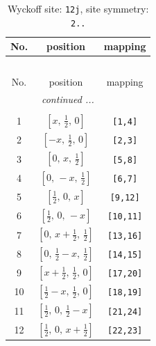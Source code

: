\documentclass[fleqn,8pt]{jsarticle}
\begin{document}
\begin{longtable}{ccc}
\caption{Wyckoff site: {\tt 12j}, site symmetry: {\tt 2..}}
 \\
 \hline \hline
No. & position & mapping \\ \hline \endfirsthead

\multicolumn{2}{l}{\tablename\ \thetable{}} \\
 \hline \hline
No. & position & mapping \\ \hline \endhead

 \hline \hline
\multicolumn{2}{r}{\footnotesize\it continued ...} \\ \endfoot

 \hline \hline
\multicolumn{2}{r}{} \\ \endlastfoot

1 & $\left[ x,\, \frac{1}{2},\, 0 \right]$ & {\tt [1,4]} \\ \hline
2 & $\left[ - x,\, \frac{1}{2},\, 0 \right]$ & {\tt [2,3]} \\ \hline
3 & $\left[ 0,\, x,\, \frac{1}{2} \right]$ & {\tt [5,8]} \\ \hline
4 & $\left[ 0,\, - x,\, \frac{1}{2} \right]$ & {\tt [6,7]} \\ \hline
5 & $\left[ \frac{1}{2},\, 0,\, x \right]$ & {\tt [9,12]} \\ \hline
6 & $\left[ \frac{1}{2},\, 0,\, - x \right]$ & {\tt [10,11]} \\ \hline
7 & $\left[ 0,\, x + \frac{1}{2},\, \frac{1}{2} \right]$ & {\tt [13,16]} \\ \hline
8 & $\left[ 0,\, \frac{1}{2} - x,\, \frac{1}{2} \right]$ & {\tt [14,15]} \\ \hline
9 & $\left[ x + \frac{1}{2},\, \frac{1}{2},\, 0 \right]$ & {\tt [17,20]} \\ \hline
10 & $\left[ \frac{1}{2} - x,\, \frac{1}{2},\, 0 \right]$ & {\tt [18,19]} \\ \hline
11 & $\left[ \frac{1}{2},\, 0,\, \frac{1}{2} - x \right]$ & {\tt [21,24]} \\ \hline
12 & $\left[ \frac{1}{2},\, 0,\, x + \frac{1}{2} \right]$ & {\tt [22,23]} \\
\end{longtable}
\renewcommand{\arraystretch}{1.2}
\end{document}

